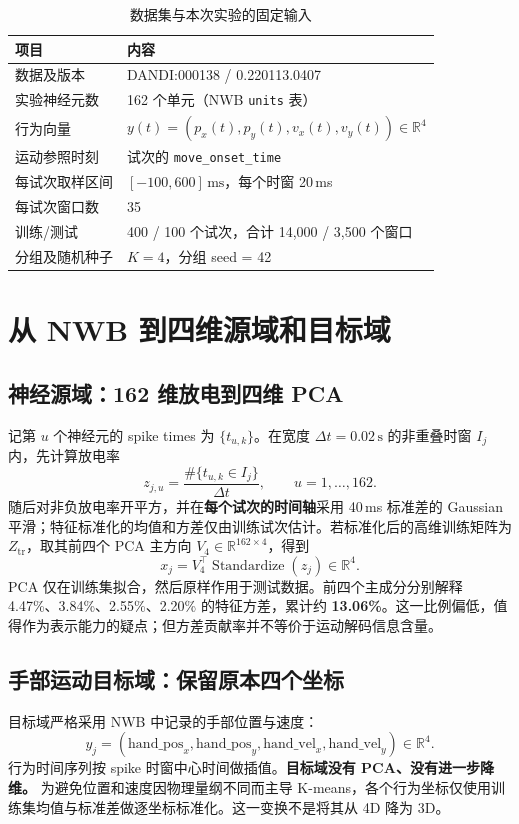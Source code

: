 \documentclass[UTF8,zihao=-4,a4paper]{ctexart}
\newcommand{\R}{\mathbb{R}}
\begin{document}
\begin{table}[H]\centering\small
\caption{数据集与本次实验的固定输入}\label{tab:data}
\begin{tabular}{@{}p{5.5cm}p{8.5cm}@{}}\toprule
项目 & 内容\\\midrule
数据及版本 & DANDI:000138 / 0.220113.0407\\
实验神经元数 & 162 个单元（NWB \texttt{units} 表）\\
行为向量 & $y(t)=(p_x(t),p_y(t),v_x(t),v_y(t))\in\R^4$\\
运动参照时刻 & 试次的 \texttt{move\_onset\_time}\\
每试次取样区间 & $[-100,600]\,\mathrm{ms}$，每个时窗 20\,ms\\
每试次窗口数 & 35\\
训练/测试 & 400 / 100 个试次，合计 14,000 / 3,500 个窗口\\
分组及随机种子 & $K=4$，分组 seed = 42\\\bottomrule
\end{tabular}
\end{table}

\section{从 NWB 到四维源域和目标域}
\subsection{神经源域：162 维放电到四维 PCA}
记第 $u$ 个神经元的 spike times 为 $\{t_{u,k}\}$。在宽度 $\Delta t=0.02\,\mathrm{s}$ 的非重叠时窗 $I_j$ 内，先计算放电率
\begin{equation}
 z_{j,u}=\frac{\#\{t_{u,k}\in I_j\}}{\Delta t},\qquad u=1,\ldots,162.
\end{equation}
随后对非负放电率开平方，并在\textbf{每个试次的时间轴}采用 40\,ms 标准差的 Gaussian 平滑；特征标准化的均值和方差仅由训练试次估计。若标准化后的高维训练矩阵为 $Z_{\mathrm{tr}}$，取其前四个 PCA 主方向 $V_4\in\R^{162\times4}$，得到
\begin{equation}
 x_j=V_4^\top\operatorname{Standardize}(z_j)\in\R^4.
\end{equation}
PCA 仅在训练集拟合，然后原样作用于测试数据。前四个主成分分别解释 4.47\%、3.84\%、2.55\%、2.20\% 的特征方差，累计约 \textbf{13.06\%}。这一比例偏低，值得作为表示能力的疑点；但方差贡献率并不等价于运动解码信息含量。

\subsection{手部运动目标域：保留原本四个坐标}
目标域严格采用 NWB 中记录的手部位置与速度：
\begin{equation}
 y_j=(\mathrm{hand\_pos}_x,\mathrm{hand\_pos}_y,\mathrm{hand\_vel}_x,\mathrm{hand\_vel}_y)\in\R^4.
\end{equation}
行为时间序列按 spike 时窗中心时间做插值。\textbf{目标域没有 PCA、没有进一步降维。} 为避免位置和速度因物理量纲不同而主导 K-means，各个行为坐标仅使用训练集均值与标准差做逐坐标标准化。这一变换不是将其从 4D 降为 3D。
\end{document}
